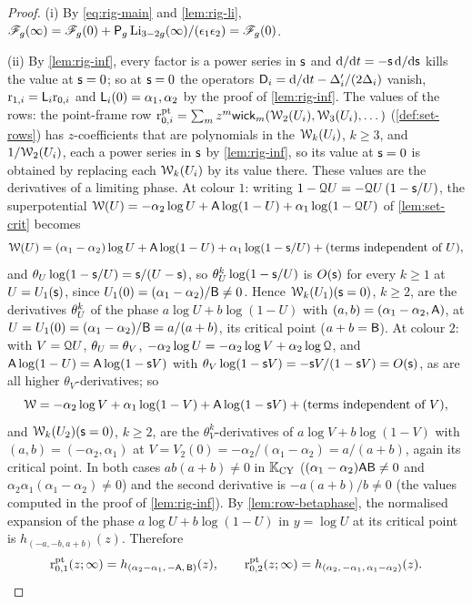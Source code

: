 \begin{proof}
(i) By \eqref{eq:rig-main} and \cref{lem:rig-li}, $\mathscr{F}_g(\infty)=\mathscr{F}_g(0)+\mathsf{P}_{g}\operatorname{Li}_{3-2g}(\infty)/(\epsilon_1\epsilon_2)=\mathscr{F}_g(0)$.

(ii) By \cref{lem:rig-inf}, every factor is a power series in $\mathsf{s}$ and $\mathrm{d}/\mathrm{d} t=-\mathsf{s}\,\mathrm{d}/\mathrm{d}\mathsf{s}$ kills the value at $\mathsf{s}=0$; so at $\mathsf{s}=0$ the operators $\mathsf{D}_i=\mathrm{d}/\mathrm{d} t-\Delta_i'/(2\Delta_i)$ vanish, $\mathrm{r}_{1,i}=\mathsf{L}_i\mathrm{r}_{0,i}$ and $\mathsf{L}_i(0)=\alpha_1,\alpha_2$ by the proof of \cref{lem:rig-inf}. The values of the rows: the point-frame row $\mathrm{r}^{\mathrm{pt}}_{0,i}=\sum_mz^m\mathsf{wick}_m(\mathcal{W}_2(U_i),\mathcal{W}_3(U_i),\dots)$ (\cref{def:set-rows}) has $z$-coefficients that are polynomials in the $\mathcal{W}_k(U_i)$, $k\geq 3$, and $1/\mathcal{W}_2(U_i)$, each a power series in $\mathsf{s}$ by \cref{lem:rig-inf}, so its value at $\mathsf{s}=0$ is obtained by replacing each $\mathcal{W}_k(U_i)$ by its value there. These values are the derivatives of a limiting phase. At colour $1$: writing $1-\mathcal{Q} U=-\mathcal{Q} U\,(1-\mathsf{s}/U)$, the superpotential $\mathcal{W}(U)=-\alpha_2\log U+\mathsf{A}\log(1-U)+\alpha_1\log(1-\mathcal{Q} U)$ of \cref{lem:set-crit} becomes
\[
\mathcal{W}(U)=(\alpha_1-\alpha_2)\log U+\mathsf{A}\log(1-U)+\alpha_1\log(1-\mathsf{s}/U)+(\text{terms independent of }U),
\]
and $\theta_{U}\log(1-\mathsf{s}/U)=\mathsf{s}/(U-\mathsf{s})$, so $\theta_{U}^k\log(1-\mathsf{s}/U)$ is $O(\mathsf{s})$ for every $k\geq 1$ at $U=U_1(\mathsf{s})$, since $U_1(0)=(\alpha_1-\alpha_2)/\mathsf{B}\neq 0$. Hence $\mathcal{W}_k(U_1)(\mathsf{s}=0)$, $k\geq 2$, are the derivatives $\theta_{U}^k$ of the phase $a\log U+b\log(1-U)$ with $(a,b)=(\alpha_1-\alpha_2,\mathsf{A})$, at $U=U_1(0)=(\alpha_1-\alpha_2)/\mathsf{B}=a/(a+b)$, its critical point ($a+b=\mathsf{B}$). At colour $2$: with $V=\mathcal{Q} U$, $\theta_{U}=\theta_V$, $-\alpha_2\log U=-\alpha_2\log V+\alpha_2\log\mathcal{Q}$, and $\mathsf{A}\log(1-U)=\mathsf{A}\log(1-\mathsf{s} V)$ with $\theta_V\log(1-\mathsf{s} V)=-\mathsf{s} V/(1-\mathsf{s} V)=O(\mathsf{s})$, as are all higher $\theta_V$-derivatives; so
\[
\mathcal{W}=-\alpha_2\log V+\alpha_1\log(1-V)+\mathsf{A}\log(1-\mathsf{s} V)+(\text{terms independent of }V),
\]
and $\mathcal{W}_k(U_2)(\mathsf{s}=0)$, $k\geq 2$, are the $\theta_V^k$-derivatives of $a\log V+b\log(1-V)$ with $(a,b)=(-\alpha_2,\alpha_1)$ at $V=V_2(0)=-\alpha_2/(\alpha_1-\alpha_2)=a/(a+b)$, again its critical point. In both cases $ab(a+b)\neq 0$ in $\mathbb{K}_{\mathrm{CY}}$ ($(\alpha_1-\alpha_2)\mathsf{A}\mathsf{B}\neq 0$ and $\alpha_2\alpha_1(\alpha_1-\alpha_2)\neq 0$) and the second derivative is $-a(a+b)/b\neq 0$ (the values computed in the proof of \cref{lem:rig-inf}). By \cref{lem:row-betaphase}, the normalised expansion of the phase $a\log U+b\log(1-U)$ in $y=\log U$ at its critical point is $h_{(-a,-b,a+b)}(z)$. Therefore
\[
\mathrm{r}^{\mathrm{pt}}_{0,1}(z;\infty)=h_{(\alpha_2-\alpha_1,\,-\mathsf{A},\,\mathsf{B})}(z),\qquad \mathrm{r}^{\mathrm{pt}}_{0,2}(z;\infty)=h_{(\alpha_2,\,-\alpha_1,\,\alpha_1-\alpha_2)}(z).
\]
\end{proof}
